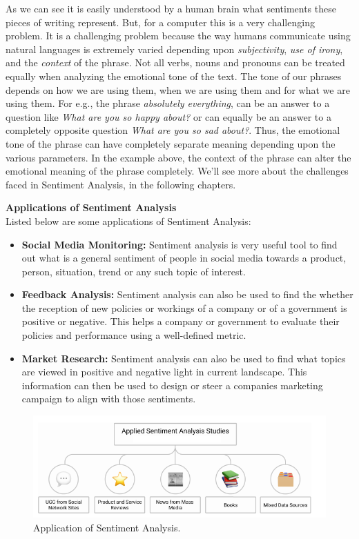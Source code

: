 \documentclass[a4paper, 12pt]{article}
\begin{document}
\begin{sloppypar}
As we can see it is easily understood by a human brain what sentiments these pieces of writing represent. But, for a computer this is a very challenging problem. It is a challenging problem because the way humans communicate using natural languages is extremely varied depending  upon \textit{subjectivity}, \textit{use of irony}, and the \textit{context} of the phrase. Not all verbs, nouns and pronouns can be treated equally when analyzing the emotional tone of the text. The tone of our phrases depends on how we are using them, when we are using them and for what we are using them. For e.g., the phrase \textit{absolutely everything}, can be an answer to a question like \textit{What are you so happy about?} or can equally be an answer to a completely opposite  question \textit{What are you so sad about?}. Thus, the emotional tone of the phrase can have completely separate meaning depending upon the various parameters. In the example above, the context of the phrase can alter the emotional meaning of the phrase completely. We'll see more about the challenges faced in Sentiment Analysis, in the following chapters.

\large \textbf{Applications of Sentiment Analysis} \\[0.5ex]
\normalsize
Listed below are some applications of Sentiment Analysis:
\begin{itemize}
\item{
\textbf{Social Media Monitoring: } Sentiment analysis is very useful tool to find out what is a general sentiment of people in social media towards a product, person, situation, trend or any such topic of interest.}
\item{
\textbf{Feedback Analysis: } Sentiment analysis can also be used to find the whether the  reception of new policies or workings of a company or of a government is positive or negative. This helps a company or government to evaluate their policies and performance using a well-defined metric.}
\item{
\textbf{Market Research: } Sentiment analysis can also be used to find what topics are viewed in positive and negative light in current landscape. This information can then be used to design or steer a companies marketing campaign to align with those sentiments.}
\end{itemize}


\begin{figure}[H]
\begin{center}
\includegraphics[scale=0.7]{cat.png}
\caption{Application of Sentiment Analysis. \label{cat}} %
\end{center}
\end{figure}


\end{sloppypar}
\end{document}
